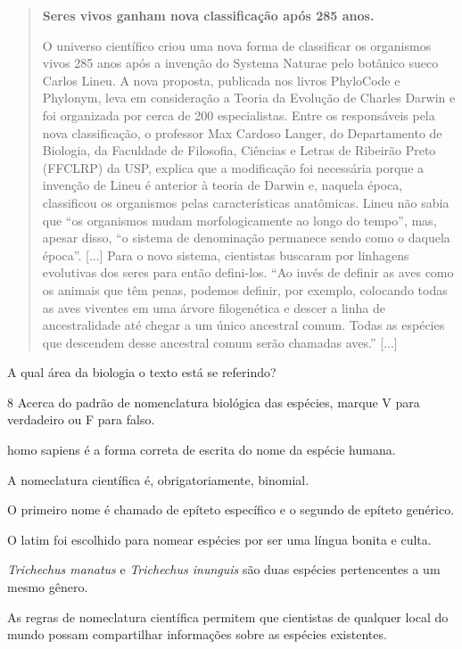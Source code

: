 \begin{quote}
\textbf{Seres vivos ganham nova classificação após 285 anos.}

O universo científico criou uma nova forma de classificar os organismos
vivos 285 anos após a invenção do Systema Naturae pelo botânico sueco
Carlos Lineu. A nova proposta, publicada nos livros PhyloCode e
Phylonym, leva em consideração a Teoria da Evolução de Charles Darwin e
foi organizada por cerca de 200 especialistas. 
Entre os responsáveis
pela nova classificação, o professor Max Cardoso Langer, do Departamento
de Biologia, da Faculdade de Filosofia, Ciências e Letras de Ribeirão
Preto (FFCLRP) da USP, explica que a modificação foi necessária porque a
invenção de Lineu é anterior à teoria de Darwin e, naquela época,
classificou os organismos pelas características anatômicas. Lineu não
sabia que ``os organismos mudam morfologicamente ao longo do tempo'',
mas, apesar disso, ``o sistema de denominação permanece sendo como o
daquela época''.  [...]
Para o novo sistema, cientistas buscaram por linhagens
evolutivas dos seres para então defini-los. ``Ao invés de definir as
aves como os animais que têm penas, podemos definir, por exemplo,
colocando todas as aves viventes em uma árvore filogenética e descer a
linha de ancestralidade até chegar a um único ancestral comum. Todas as
espécies que descendem desse ancestral comum serão chamadas aves.'' [...]

\end{quote}

A qual área da biologia o texto está se referindo?



\num{8}  Acerca do padrão de nomenclatura biológica das espécies, marque V para verdadeiro ou F para falso.

\begin{boxlist}
 homo sapiens é a forma correta de escrita do nome da espécie humana.

 A nomeclatura científica é, obrigatoriamente, binomial.

 O primeiro nome é chamado de epíteto específico e o segundo de
epíteto genérico.

 O latim foi escolhido para nomear espécies por ser uma língua bonita
e culta.

 \emph{Trichechus manatus} e \emph{Trichechus inunguis} são duas
espécies pertencentes a um mesmo gênero.

 As regras de nomeclatura científica permitem que cientistas de
qualquer local do mundo possam compartilhar informações sobre as
espécies existentes.
\end{boxlist}

